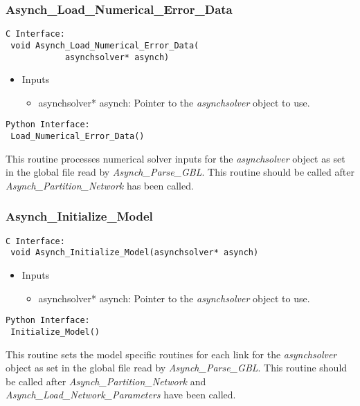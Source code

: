 \documentclass[12pt]{article}
\begin{document}
\subsubsection{Asynch\_Load\_Numerical\_Error\_Data} \label{sec: asynch_load_numerical_error_data}

\begin{lstlisting}[style=CStyle]
 C Interface:
 void Asynch_Load_Numerical_Error_Data(
			asynchsolver* asynch)
\end{lstlisting}
\begin{itemize}
 \item Inputs
  \begin{itemize}
   \item asynchsolver* asynch: Pointer to the \emph{asynchsolver} object to use.
  \end{itemize}
\end{itemize}
\begin{lstlisting}[style=PythonStyle]
 Python Interface:
 Load_Numerical_Error_Data()
\end{lstlisting}
This routine processes numerical solver inputs for the \emph{asynchsolver} object as set in the global file read by \emph{Asynch\_Parse\_GBL}. This routine should be called after \emph{Asynch\_Partition\_Network} has been called.

\subsubsection{Asynch\_Initialize\_Model} \label{sec: asynch_initialize_model}

\begin{lstlisting}[style=CStyle]
 C Interface:
 void Asynch_Initialize_Model(asynchsolver* asynch)
\end{lstlisting}
\begin{itemize}
 \item Inputs
  \begin{itemize}
   \item asynchsolver* asynch: Pointer to the \emph{asynchsolver} object to use.
  \end{itemize}
\end{itemize}
\begin{lstlisting}[style=PythonStyle]
 Python Interface:
 Initialize_Model()
\end{lstlisting}
This routine sets the model specific routines for each link for the \emph{asynchsolver} object as set in the global file read by \emph{Asynch\_Parse\_GBL}. This routine should be called after \emph{Asynch\_Partition\_Network} and \emph{Asynch\_Load\_Network\_Parameters} have been called.
\end{document}
